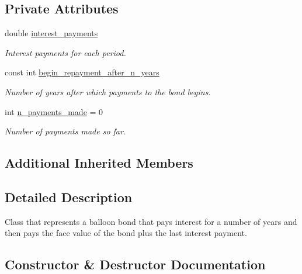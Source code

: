 \subsection*{Private Attributes}
\begin{DoxyCompactItemize}
\item 
double \mbox{\hyperlink{classBalloonPaymentBond_ac73d3ec9b640614f454d8cc8bd1ebbc3}{interest\+\_\+payments}}
\begin{DoxyCompactList}\small\item\em Interest payments for each period. \end{DoxyCompactList}\item 
const int \mbox{\hyperlink{classBalloonPaymentBond_a7e1e064643021755eda4873b0c98e434}{begin\+\_\+repayment\+\_\+after\+\_\+n\+\_\+years}}
\begin{DoxyCompactList}\small\item\em Number of years after which payments to the bond begins. \end{DoxyCompactList}\item 
int \mbox{\hyperlink{classBalloonPaymentBond_a82255e2f56110503d126fefbbc192d67}{n\+\_\+payments\+\_\+made}} = 0
\begin{DoxyCompactList}\small\item\em Number of payments made so far. \end{DoxyCompactList}\end{DoxyCompactItemize}
\subsection*{Additional Inherited Members}


\subsection{Detailed Description}
Class that represents a balloon bond that pays interest for a number of years and then pays the face value of the bond plus the last interest payment. 

\subsection{Constructor \& Destructor Documentation}
\mbox{\label{classBalloonPaymentBond_a03b25124896e67f851a35721c37705fe}} 
